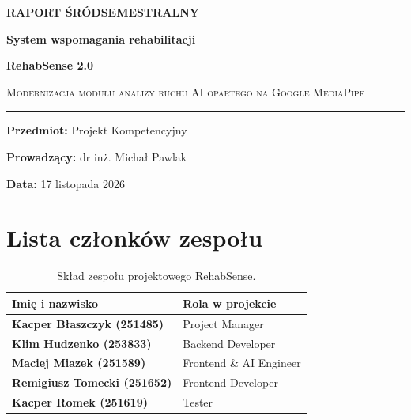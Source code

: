 \documentclass[11pt,a4paper]{article}
\begin{document}

\begin{titlepage}
\centering
\vspace*{1.5cm}
{\Huge\bfseries\color{primary} RAPORT ŚRÓDSEMESTRALNY\par}
\vspace{0.4cm}
{\LARGE\bfseries System wspomagania rehabilitacji\par}
\vspace{0.3cm}
{\Huge\bfseries\color{accent} RehabSense 2.0\par}
\vspace{0.8cm}
{\large\textsc{Modernizacja modułu analizy ruchu AI opartego na Google MediaPipe}\par}
\vspace{1.2cm}
\rule{0.75\textwidth}{1.2pt}\par
\vspace{1.2cm}


{\large\textbf{Przedmiot:} Projekt Kompetencyjny\par}
\vspace{0.3cm}
{\large\textbf{Prowadzący:} dr inż. Michał Pawlak\par}
\vspace{0.3cm}
{\large\textbf{Data:} 17 listopada 2026\par}


\end{titlepage}

\newpage
{}

\section*{Lista członków zespołu}
\begin{table}[ht]
\centering
\begin{tabularx}{0.85\textwidth}{>{\raggedright\arraybackslash\bfseries}p{6.0cm} Y}
\toprule
\textbf{Imię i nazwisko} & \textbf{Rola w projekcie} \\
\midrule
Kacper Błaszczyk (251485) & Project Manager \\
Klim Hudzenko (253833) & Backend Developer \\
Maciej Miazek (251589) & Frontend \& AI Engineer \\
Remigiusz Tomecki (251652) & Frontend Developer \\
Kacper Romek (251619) & Tester \\
\bottomrule
\end{tabularx}
\caption{Skład zespołu projektowego RehabSense.}
\end{table}
\end{document}
